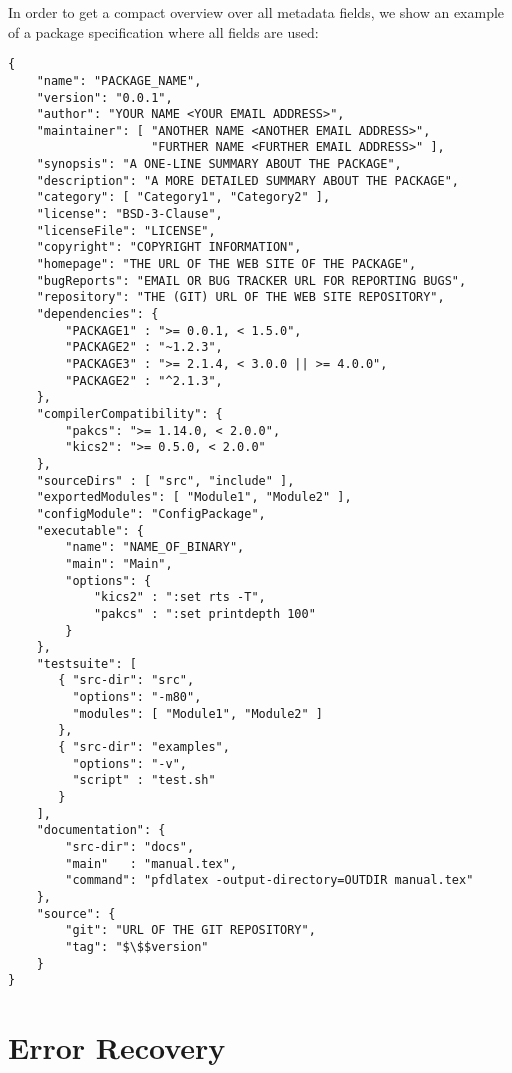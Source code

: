\documentclass[11pt]{article}
\begin{document}
%
In order to get a compact overview over all metadata fields,
we show an example of a package specification where all fields
are used:
%
\begin{lstlisting}
{
    "name": "PACKAGE_NAME",
    "version": "0.0.1",
    "author": "YOUR NAME <YOUR EMAIL ADDRESS>",
    "maintainer": [ "ANOTHER NAME <ANOTHER EMAIL ADDRESS>",
                    "FURTHER NAME <FURTHER EMAIL ADDRESS>" ],
    "synopsis": "A ONE-LINE SUMMARY ABOUT THE PACKAGE",
    "description": "A MORE DETAILED SUMMARY ABOUT THE PACKAGE",
    "category": [ "Category1", "Category2" ],
    "license": "BSD-3-Clause",
    "licenseFile": "LICENSE",
    "copyright": "COPYRIGHT INFORMATION",
    "homepage": "THE URL OF THE WEB SITE OF THE PACKAGE",
    "bugReports": "EMAIL OR BUG TRACKER URL FOR REPORTING BUGS",
    "repository": "THE (GIT) URL OF THE WEB SITE REPOSITORY",
    "dependencies": {
        "PACKAGE1" : ">= 0.0.1, < 1.5.0",
        "PACKAGE2" : "~1.2.3",
        "PACKAGE3" : ">= 2.1.4, < 3.0.0 || >= 4.0.0",
        "PACKAGE2" : "^2.1.3",
    },
    "compilerCompatibility": {
        "pakcs": ">= 1.14.0, < 2.0.0",
        "kics2": ">= 0.5.0, < 2.0.0"
    },
    "sourceDirs" : [ "src", "include" ],
    "exportedModules": [ "Module1", "Module2" ],
    "configModule": "ConfigPackage",
    "executable": {
        "name": "NAME_OF_BINARY",
        "main": "Main",
        "options": {
            "kics2" : ":set rts -T",
            "pakcs" : ":set printdepth 100"
        }
    },
    "testsuite": [
       { "src-dir": "src",
         "options": "-m80",
         "modules": [ "Module1", "Module2" ]
       },
       { "src-dir": "examples",
         "options": "-v",
         "script" : "test.sh"
       }
    ],
    "documentation": {
        "src-dir": "docs",
        "main"   : "manual.tex",
        "command": "pfdlatex -output-directory=OUTDIR manual.tex"
    },
    "source": {
        "git": "URL OF THE GIT REPOSITORY",
        "tag": "$\$$version"
    }
}
\end{lstlisting}


\clearpage

\section{Error Recovery}
\label{sec:recovery}
\end{document}
